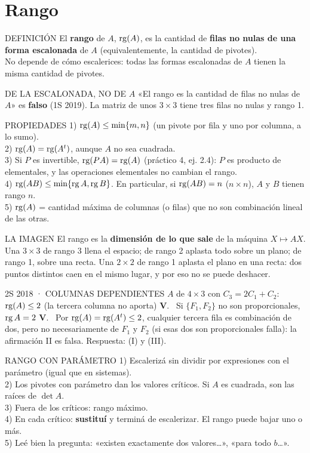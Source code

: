 \section{Rango}
\begin{sello}{DEFINICIÓN}
El \textbf{rango} de $A$, $\operatorname{rg}(A)$, es la cantidad de \textbf{filas no nulas de una forma escalonada} de $A$ (equivalentemente, la cantidad de pivotes).\\[2pt]
No depende de cómo escalerices: todas las formas escalonadas de $A$ tienen la misma cantidad de pivotes.
\end{sello}
\begin{trampa}{DE LA ESCALONADA, NO DE $A$}
«El rango es la cantidad de filas no nulas de $A$» es \textbf{falso} (1S 2019). La matriz de unos $3\times3$ tiene tres filas no nulas y rango 1.
\end{trampa}
\begin{sello}{PROPIEDADES}
1) $\operatorname{rg}(A)\le\min\{m,n\}$ (un pivote por fila y uno por columna, a lo sumo).\\
2) $\operatorname{rg}(A)=\operatorname{rg}(A^t)$, aunque $A$ no sea cuadrada.\\
3) Si $P$ es invertible, $\operatorname{rg}(PA)=\operatorname{rg}(A)$ (práctico 4, ej. 2.4): $P$ es producto de elementales, y las operaciones elementales no cambian el rango.\\
4) $\operatorname{rg}(AB)\le\min\{\operatorname{rg} A,\operatorname{rg} B\}$. En particular, si $\operatorname{rg}(AB)=n$ ($n\times n$), $A$ y $B$ tienen rango $n$.\\
5) $\operatorname{rg}(A)$ = cantidad máxima de columnas (o filas) que no son combinación lineal de las otras.
\end{sello}
\begin{tip}{LA IMAGEN}
El rango es la \textbf{dimensión de lo que sale} de la máquina $X\mapsto AX$. Una $3\times3$ de rango 3 llena el espacio; de rango 2 aplasta todo sobre un plano; de rango 1, sobre una recta. Una $2\times2$ de rango 1 aplasta el plano en una recta: dos puntos distintos caen en el mismo lugar, y por eso no se puede deshacer.
\end{tip}
\begin{memo}{2S 2018 · COLUMNAS DEPENDIENTES}
$A$ de $4\times3$ con $C_3=2C_1+C_2$: \ $\operatorname{rg}(A)\le2$ (la tercera columna no aporta) \textbf{V}. \ Si $\{F_1,F_2\}$ no son proporcionales, $\operatorname{rg} A=2$ \textbf{V}. \ Por $\operatorname{rg}(A)=\operatorname{rg}(A^t)\le2$, cualquier tercera fila es combinación de dos, pero no necesariamente de $F_1$ y $F_2$ (si esas dos son proporcionales falla): la afirmación II es falsa. Respuesta: (I) y (III).
\end{memo}
\begin{metodo}{RANGO CON PARÁMETRO}
1) Escalerizá sin dividir por expresiones con el parámetro (igual que en sistemas).\\
2) Los pivotes con parámetro dan los valores críticos. Si $A$ es cuadrada, son las raíces de $\det A$.\\
3) Fuera de los críticos: rango máximo.\\
4) En cada crítico: \textbf{sustituí} y terminá de escalerizar. El rango puede bajar uno o más.\\
5) Leé bien la pregunta: «existen exactamente dos valores\dots», «para todo $b$\dots».
\end{metodo}

